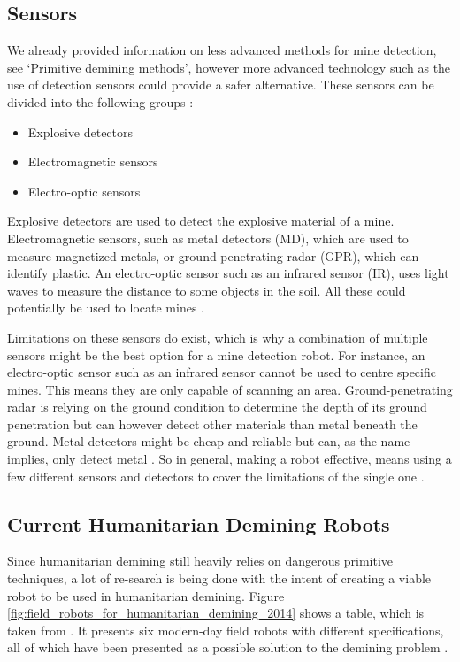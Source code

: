 \subsection{Sensors}

We already provided information on less advanced methods for mine detection, see ‘Primitive demining methods’, however more advanced technology such as the use of detection sensors could provide a safer alternative. These sensors can be divided into the following groups \cite{HumanitarianDemining2017}:
\begin{itemize}
\setlength{\itemsep}{0.05\baselineskip}
	\item Explosive detectors
	\item Electromagnetic sensors
	\item Electro-optic sensors
\end{itemize}

Explosive detectors are used to detect the explosive material of a mine. Electromagnetic sensors, such as metal detectors (MD), which are used to measure magnetized metals, or ground penetrating radar (GPR), which can identify plastic. An electro-optic sensor such as an infrared sensor (IR), uses light waves to measure the distance to some objects in the soil. All these could potentially be used to locate mines \cite{HumanitarianDemining2017}.

Limitations on these sensors do exist, which is why a combination of multiple sensors might be the best option for a mine detection robot. For instance, an electro-optic sensor such as an infrared sensor cannot be used to centre specific mines. This means they are only capable of scanning an area. Ground-penetrating radar is relying on the ground condition to determine the depth of its ground penetration but can however detect other materials than metal beneath the ground. Metal detectors might be cheap and reliable but can, as the name implies, only detect metal \cite{HumanitarianDemining2017}.
So in general, making a robot effective, means using a few different sensors and detectors to cover the limitations of the single one \cite{6LeggedRobot2007}.

\subsection{Current Humanitarian Demining Robots}

Since humanitarian demining still heavily relies on dangerous primitive techniques, a lot of re-search is being done with the intent of creating a viable robot to be used in humanitarian demining. Figure \ref{fig:field_robots_for_humanitarian_demining_2014} shows a table, which is taken from \cite{FieldRobots2014}. It presents six modern-day field robots with different specifications, all of which have been presented as a possible solution to the demining problem \cite{FieldRobots2014}.

